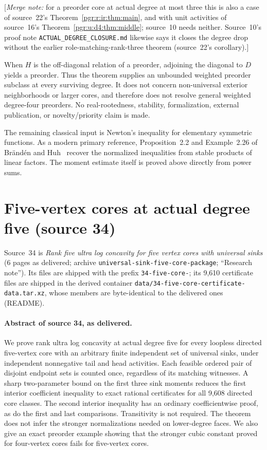 \documentclass[11pt]{article}
\numberwithin{equation}{section}
\theoremstyle{definition}\newtheorem{definition}[theorem]{Definition}\newtheorem{remark}[theorem]{Remark}
\newcommand{\mnote}[1]{[\textit{Merge note:} #1]}
\begin{document}
\mnote{for a preorder core at actual degree at most three this is also a
case of source~22's Theorem~\ref{pgr:r:ir:thm:main}, and with unit
activities of source~16's Theorem~\ref{pgr:u:d4:thm:middle}; source~10
needs neither. Source~10's proof note \texttt{ACTUAL\_DEGREE\_CLOSURE.md}
likewise says it closes the degree drop without the earlier
role-matching-rank-three theorem (source~22's corollary).}

When $H$ is the off-diagonal relation of a preorder, adjoining the diagonal to $D$ yields a preorder. Thus the theorem supplies an unbounded weighted preorder subclass at every surviving degree. It does not concern non-universal exterior neighborhoods or larger cores, and therefore does not resolve general weighted degree-four preorders. No real-rootedness, stability, formalization, external publication, or novelty/priority claim is made.

The remaining classical input is Newton's inequality for elementary symmetric functions. As a modern primary reference, Proposition~2.2 and Example~2.26 of Br\"and\'en and Huh~\cite{BH} recover the normalized inequalities from stable products of linear factors. The moment estimate itself is proved above directly from power sums.


\section{Five-vertex cores at actual degree five (source 34)}\label{pgr:s:fc:sec}

Source~34 is \emph{Rank five ultra log concavity for five vertex cores with
universal sinks} (6 pages as delivered; archive
\texttt{universal-sink-five-core-package}; ``Research note''). Its files are
shipped with the prefix \texttt{34-five-core-}; its 9,610 certificate files
are shipped in the derived container
\texttt{data/34-five-core-certificate-data.tar.xz}, whose members are
byte-identical to the delivered ones (README).

\paragraph{Abstract of source 34, as delivered.}

We prove rank ultra log concavity at actual degree five for every loopless directed five-vertex core with an arbitrary finite independent set of universal sinks, under independent nonnegative tail and head activities. Each feasible ordered pair of disjoint endpoint sets is counted once, regardless of its matching witnesses. A sharp two-parameter bound on the first three sink moments reduces the first interior coefficient inequality to exact rational certificates for all 9,608 directed core classes. The second interior inequality has an ordinary coefficientwise proof, as do the first and last comparisons. Transitivity is not required. The theorem does not infer the stronger normalizations needed on lower-degree faces. We also give an exact preorder example showing that the stronger cubic constant proved for four-vertex cores fails for five-vertex cores.
\end{document}
